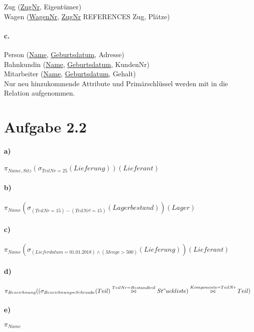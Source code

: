\documentclass[12pt]{article}
\begin{document}
 	Zug (\underline{ZugNr}, Eigentümer)\\[1.3em]
 	
 	Wagen (\underline{WagenNr}, \underline{ZugNr} REFERENCES Zug, Plätze)\\[1.3em]
 	
 	\paragraph*{c.}
 	Person (\underline{Name}, \underline{Geburtsdatum}, Adresse) \\[1,3em]
 	
 	Bahnkundin (\underline{Name}, \underline{Geburtsdatum}, KundenNr) \\[1,3em]
 	
 	Mitarbeiter (\underline{Name}, \underline{Geburtsdatum}, Gehalt) \\[1,3em]
 	Nur neu hinzukommende Attribute und Primärschlüssel werden mit in die Relation aufgenommen.
 		
 	\section*{Aufgabe 2.2}
 	
 	\paragraph*{a)}
 	$\pi_{Name, Sitz}(\sigma_{TeilNr=25}(Lieferung))(Lieferant)$
 	
 	\paragraph*{b)}
 	$\pi_{Name}(\sigma_{(TeilNr=15) - (TeilNr != 15)}(Lagerbestand))(Lager)$
 	
 	
 	\paragraph*{c)}
 	$\pi_{Name}(\sigma_{(Lieferdatum = 01.01.2018) \wedge (Menge > 500)}(Lieferung))(Lieferant)$
 	
 	
 	\paragraph*{d)}
 	$\pi_{Bezeichnung}(\large(\sigma_{Bezeichnung=Schraube}(Teil) \overset{TeilNr = Bestandteil}{\bowtie} St"uckliste\large) \overset{Komponente = TeilNr}{\bowtie} Teil)$
 	
 	\paragraph*{e)}
 	$\pi_{Name}$
 
\end{document}
